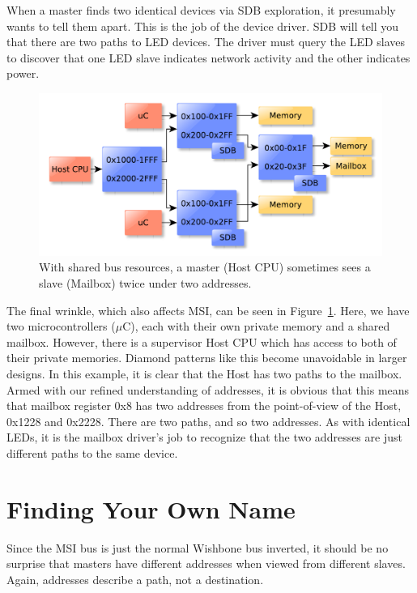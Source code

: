\documentclass[a4paper]{jacow}
\begin{document}
When a master finds two identical devices via SDB exploration,
it presumably wants to tell them apart.
This is the job of the device driver.
SDB will tell you that there are two paths to LED devices.
The driver must query the LED slaves to discover that one LED slave
indicates network activity and the other indicates power.

\begin{figure}[t]
  \centering
  \includegraphics*[width=\columnwidth]{diamond-bus}
  \caption{With shared bus resources, a master (Host CPU)
  sometimes sees a slave (Mailbox) twice under two addresses.}
  \label{fig:diamond-bus}
\end{figure}

The final wrinkle, which also affects MSI, can be seen in
Figure~\ref{fig:diamond-bus}.
Here, we have two microcontrollers ($\mu$C), each with their own private
memory and a shared mailbox.
However, there is a supervisor Host CPU which has access to both of their
private memories.
Diamond patterns like this become unavoidable in larger designs.
In this example, it is clear that the Host has two paths to the mailbox.
Armed with our refined understanding of addresses, 
it is obvious that this means that mailbox register 0x8 has two addresses
from the point-of-view of the Host, 0x1228 and 0x2228.
There are two paths, and so two addresses.
As with identical LEDs, it is the mailbox driver's job to recognize that the
two addresses are just different paths to the same device.

\section{Finding Your Own Name}

Since the MSI bus is just the normal Wishbone bus inverted,
it should be no surprise that masters have different addresses when
viewed from different slaves.
Again, addresses describe a path, not a destination.
\end{document}
